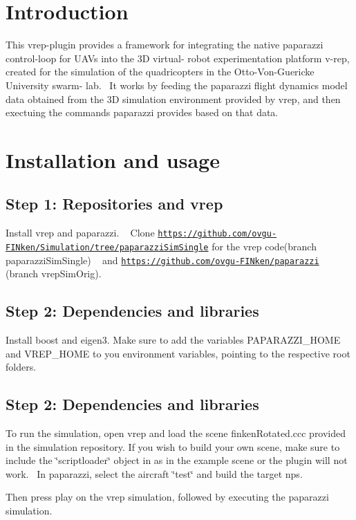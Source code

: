 \hypertarget{index_intro_sec}{}\section{Introduction}\label{index_intro_sec}
This vrep-\/plugin provides a framework for integrating the native paparazzi control-\/loop for U\+A\+Vs into the 3D virtual-\/ robot experimentation platform v-\/rep, created for the simulation of the quadricopters in the Otto-\/\+Von-\/\+Guericke University swarm-\/ lab.~\newline
 It works by feeding the paparazzi flight dynamics model data obtained from the 3D simulation environment provided by vrep, and then exectuing the commands paparazzi provides based on that data.\hypertarget{index_install_sec}{}\section{Installation and usage}\label{index_install_sec}
\hypertarget{index_step1}{}\subsection{Step 1\+: Repositories and vrep}\label{index_step1}
Install vrep and paparazzi. ~\newline
 Clone \href{https://github.com/ovgu-FINken/Simulation/tree/paparazziSimSingle}{\tt https\+://github.\+com/ovgu-\/\+F\+I\+Nken/\+Simulation/tree/paparazzi\+Sim\+Single} for the vrep code(branch paparazzi\+Sim\+Single) ~\newline
 and \href{https://github.com/ovgu-FINken/paparazzi}{\tt https\+://github.\+com/ovgu-\/\+F\+I\+Nken/paparazzi} (branch vrep\+Sim\+Orig).\hypertarget{index_step2}{}\subsection{Step 2\+: Dependencies and libraries}\label{index_step2}
Install boost and eigen3. Make sure to add the variables P\+A\+P\+A\+R\+A\+Z\+Z\+I\+\_\+\+H\+O\+ME and V\+R\+E\+P\+\_\+\+H\+O\+ME to you environment variables, pointing to the respective root folders.\hypertarget{index_step2}{}\subsection{Step 2\+: Dependencies and libraries}\label{index_step2}
To run the simulation, open vrep and load the scene finken\+Rotated.\+ccc provided in the simulation repository. If you wish to build your own scene, make sure to include the \char`\"{}scriptloader\char`\"{} object in as in the example scene or the plugin will not work.~\newline
 In paparazzi, select the aircraft \char`\"{}test\char`\"{} and build the target nps.

Then press play on the vrep simulation, followed by executing the paparazzi simulation. 